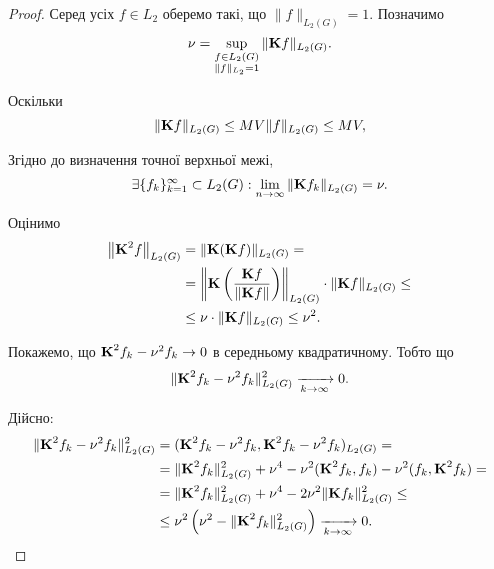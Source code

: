 \begin{proof}
	Серед усіх $f \in L_2$ оберемо такі, що $\|f\|_{L_2(G)} = 1$. Позначимо 
	\begin{equation}
		\nu = \Sup_{\substack{f \in L_2(G) \\ \|f\|_{L_2} = 1}} \|\bf{K} f\|_{L_2(G)}.
	\end{equation}
	
	Оскільки
	\begin{equation}
		\|\bf{K} f\|_{L_2(G)} \le MV \|f\|_{L_2(G)} \le MV,
	\end{equation}


	Згідно до визначення точної верхньої межі,
	\begin{equation}
		\exists \{ f_k \}_{k = 1}^\infty \subset L_2(G):\lim_{n \to \infty} \|\bf{K} f_k\|_{L_2(G)} = \nu.
	\end{equation}

	Оцінимо 
	\begin{equation}
		\begin{aligned} 
		\left\| \bf{K}^2 f\right\|_{L_2(G)} &= \| \bf{K} (\bf{K} f)\|_{L_2(G)} = \\
		&=  \left\| \bf{K}\left( \dfrac{\bf{K}f}{\|\bf{K}f\|}\right) \right\|_{L_2(G)} \cdot \|\bf{K} f\|_{L_2(G)} \le \\
		&\le  \nu \cdot \|\bf{K} f\|_{L_2(G)} \le \nu^2.
		\end{aligned}
	\end{equation}
	
	Покажемо, що $\bf{K}^2 f_k - \nu^2 f_k \to 0$ в середньому квадратичному. Тобто що
	\begin{equation}
		\| \bf{K}^2 f_k - \nu^2 f_k \|_{L_2(G)}^2 \xrightarrow[k \to \infty]{} 0.
	\end{equation}

	Дійсно:
	\begin{equation}
		\begin{aligned}
			\| \bf{K}^2 f_k - \nu^2 f_k \|_{L_2(G)}^2 &= (\bf{K}^2 f_k - \nu^2 f_k, \bf{K}^2 f_k - \nu^2 f_k)_{L_2(G)} = \\
			&= \|\bf{K}^2 f_k\|_{L_2(G)}^2 + \nu^4 - \nu^2 (\bf{K}^2 f_k, f_k) - \nu^2 (f_k, \bf{K}^2 f_k) = \\
			&= \|\bf{K}^2 f_k\|_{L_2(G)}^2 + \nu^4 - 2 \nu^2 \|\bf{K} f_k\|_{L_2(G)}^2 \le \\
			&\le \nu^2 \left(\nu^2 - \|\bf{K}^2 f_k\|_{L_2(G)}^2\right) \xrightarrow[k\to\infty]{} 0.
		\end{aligned}
	\end{equation}


\end{proof}

